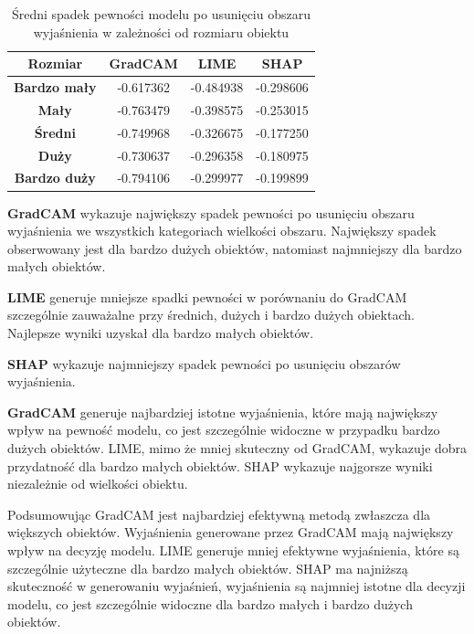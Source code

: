 \begin{table}[h]
	\centering
	\begin{tabular}{|c|c|c|c|}
		\hline
		\textbf{Rozmiar}     & \textbf{GradCAM} & \textbf{LIME} & \textbf{SHAP} \\
		\hline
		\textbf{Bardzo mały} & -0.617362        & -0.484938     & -0.298606     \\
		\hline
		\textbf{Mały}        & -0.763479        & -0.398575     & -0.253015     \\
		\hline
		\textbf{Średni}      & -0.749968        & -0.326675     & -0.177250     \\
		\hline
		\textbf{Duży}        & -0.730637        & -0.296358     & -0.180975     \\
		\hline
		\textbf{Bardzo duży} & -0.794106        & -0.299977     & -0.199899     \\
		\hline
	\end{tabular}
	\caption{Średni spadek pewności modelu po usunięciu obszaru wyjaśnienia w zależności od rozmiaru obiektu }
	\label{tab:size_confidence_no_exp}
\end{table}

\textbf{GradCAM} wykazuje największy spadek pewności po usunięciu obszaru wyjaśnienia we wszystkich kategoriach wielkości obszaru.
Największy spadek obserwowany jest dla bardzo dużych obiektów, natomiast najmniejszy dla bardzo małych obiektów.

\textbf{LIME} generuje mniejsze spadki pewności w porównaniu do GradCAM szczególnie zauważalne przy średnich, dużych i bardzo dużych obiektach.
Najlepsze wyniki uzyskał dla bardzo małych obiektów.

\textbf{SHAP} wykazuje najmniejszy spadek pewności po usunięciu obszarów wyjaśnienia.

\textbf{GradCAM} generuje najbardziej istotne wyjaśnienia, które mają największy wpływ na pewność modelu, co jest szczególnie widoczne w przypadku bardzo dużych obiektów.
LIME, mimo że mniej skuteczny od GradCAM, wykazuje dobra przydatność dla bardzo małych obiektów.
SHAP wykazuje najgorsze wyniki niezależnie od wielkości obiektu.

\vspace{1cm}
Podsumowując GradCAM jest najbardziej efektywną metodą zwłaszcza dla większych obiektów.
Wyjaśnienia generowane przez GradCAM mają największy wpływ na decyzję modelu.
LIME generuje mniej efektywne wyjaśnienia, które są szczególnie użyteczne dla bardzo małych obiektów.
SHAP ma najniższą skuteczność w generowaniu wyjaśnień, wyjaśnienia są najmniej istotne dla decyzji modelu, co jest szczególnie widoczne dla bardzo małych i bardzo dużych obiektów.
